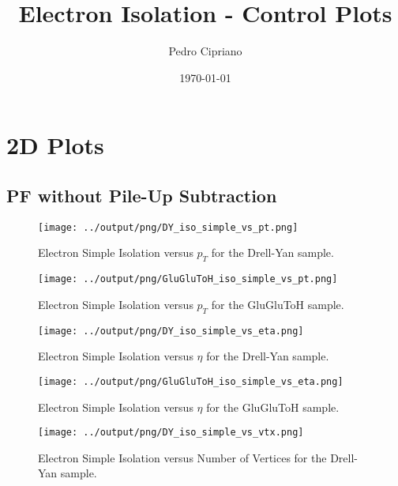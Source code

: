 \documentclass[11pt]{book}
\begin{document}
         
 
 \author{Pedro Cipriano}
 \date{\today}
 \title{Electron Isolation - Control Plots}

\maketitle

\tableofcontents

\chapter{2D Plots}
\section{PF without Pile-Up Subtraction}

\begin{figure}[htb]
\centering
\texttt{[image: ../output/png/DY\_iso\_simple\_vs\_pt.png]}
\caption{Electron Simple Isolation versus $p_{T}$ for the Drell-Yan sample.}
\label{fig:dy_iso_simple_vs_pt}
\end{figure}

\begin{figure}[htb]
\centering
\texttt{[image: ../output/png/GluGluToH\_iso\_simple\_vs\_pt.png]}
\caption{Electron Simple Isolation versus $p_{T}$ for the GluGluToH sample.}
\label{fig:ggh_iso_simple_vs_pt}
\end{figure}

\begin{figure}[htb]
\centering
\texttt{[image: ../output/png/DY\_iso\_simple\_vs\_eta.png]}
\caption{Electron Simple Isolation versus $\eta$ for the Drell-Yan sample.}
\label{fig:dy_iso_simple_vs_eta}
\end{figure}

\begin{figure}[htb]
\centering
\texttt{[image: ../output/png/GluGluToH\_iso\_simple\_vs\_eta.png]}
\caption{Electron Simple Isolation versus $\eta$ for the GluGluToH sample.}
\label{fig:ggh_iso_simple_vs_eta}
\end{figure}

\begin{figure}[htb]
\centering
\texttt{[image: ../output/png/DY\_iso\_simple\_vs\_vtx.png]}
\caption{Electron Simple Isolation versus Number of Vertices for the Drell-Yan sample.}
\label{fig:dy_iso_simple_vs_vtx}
\end{figure}
\end{document}
